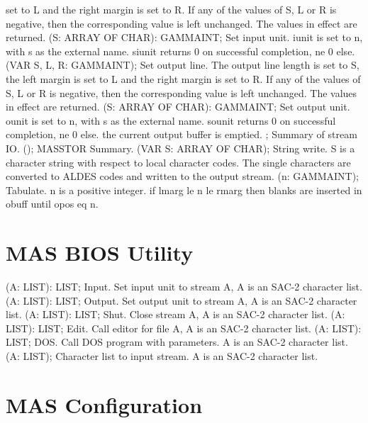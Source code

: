 set to L and the right margin is set to R. If any of the values of 
S, L or R is negative, then the corresponding value is left unchanged. 
The values in effect are returned.  \ecom 
{} (S: ARRAY OF CHAR): GAMMAINT; \eproc
\bcom Set input unit. iunit is set to n, with s as the external name.
siunit returns 0 on successful completion, ne 0 else. \ecom 
{} (VAR S, L, R: GAMMAINT); \eproc
\bcom Set output line. The output line length is set to S, the left margin is
set to L and the right margin is set to R. If any of the values of 
S, L or R is negative, then the corresponding value is left unchanged. 
The values in effect are returned.  \ecom 
{} (S: ARRAY OF CHAR): GAMMAINT; \eproc
\bcom Set output unit. ounit is set to n, with s as the external name.
sounit returns 0 on successful completion, ne 0 else.
the current output buffer is emptied. \ecom 
{} ; \eproc
\bcom Summary of stream IO.  \ecom 
{} (); \eproc
\bcom MASSTOR Summary.  \ecom 
{} (VAR S: ARRAY OF CHAR); \eproc
\bcom String write. S is a character string with respect to local
character codes. The single characters are converted to ALDES codes
and written to the output stream.  \ecom 
{} (n: GAMMAINT); \eproc
\bcom Tabulate. n is a positive integer. if lmarg le n le rmarg then
blanks are inserted in obuff until opos eq n. \ecom 
\section{ MAS BIOS Utility  } 
 (A: LIST): LIST; \eproc
\bcom Input. Set input unit to stream A, A is an SAC-2 character list.  \ecom 
{} (A: LIST): LIST; \eproc
\bcom Output. Set output unit to stream A, A is an SAC-2 character list.  \ecom 
{} (A: LIST): LIST; \eproc
\bcom Shut. Close stream A, A is an SAC-2 character list.  \ecom 
{} (A: LIST): LIST; \eproc
\bcom Edit. Call editor for file A, A is an SAC-2 character list.  \ecom 
{} (A: LIST): LIST; \eproc
\bcom DOS. Call DOS program with parameters. A is an SAC-2 character list.  \ecom 
{} (A: LIST); \eproc
\bcom Character list to input stream. A is an SAC-2 character list.  \ecom 
\section{ MAS Configuration  } 
